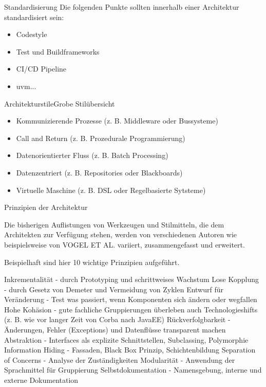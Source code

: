 \documentclass{beamer}
\begin{document}
\begin{frame}{Standardisierung}
	Die folgenden Punkte sollten innerhalb einer Architektur standardisiert sein:

	\begin{itemize}
		\item Codestyle
		\item Test und Buildframeworks
		\item CI/CD Pipeline
		\item uvm...
	\end{itemize}
\end{frame}

\begin{frame}{Architekturstile}{Grobe Stilübersicht}

	\begin{itemize}
		\item Kommunizierende Prozesse (z. B. Middleware oder Bussysteme)
		\item Call and Return (z. B. Prozedurale Programmierung)
		\item Datenorientierter Fluss (z. B. Batch Processing)
		\item Datenzentriert (z. B. Repositories oder Blackboards)
		\item Virtuelle Maschine (z. B. DSL oder Regelbasierte Sytsteme)
	\end{itemize}




\end{frame}

\begin{frame}{Prinzipien der Architektur}

Die bisherigen Auflistungen von Werkzeugen und Stilmitteln, die dem Architekten zur Verfügung stehen, werden von verschiedenen Autoren wie beispielsweise von VOGEL ET AL. variiert, zusammengefasst und erweitert.

Beispielhaft sind hier 10 wichtige Prinzipien aufgeführt.

    Inkrementalität
    - durch Prototyping und schrittweises Wachstum
    Lose Kopplung
    - durch Gesetz von Demeter und Vermeidung von Zyklen
    Entwurf für Veränderung
    - Test was passiert, wenn Komponenten sich ändern oder wegfallen
    Hohe Kohäsion
    - gute fachliche Gruppierungen überleben auch Technologieshifts (z. B. wie vor langer Zeit von Corba nach JavaEE)
    Rückverfolgbarkeit
    - Änderungen, Fehler (Exceptions) und Datenflüsse transparent machen
    Abstraktion
    - Interfaces als explizite Schnittstellen, Subclassing, Polymorphie
    Information Hiding
    - Fassaden, Black Box Prinzip, Schichtenbildung
    Separation of Concerns
    - Analyse der Zuständigkeiten
    Modularität
    - Anwendung der Sprachmittel für Gruppierung
    Selbstdokumentation
    - Namensgebung, interne und externe Dokumentation
\end{frame}
\end{document}
